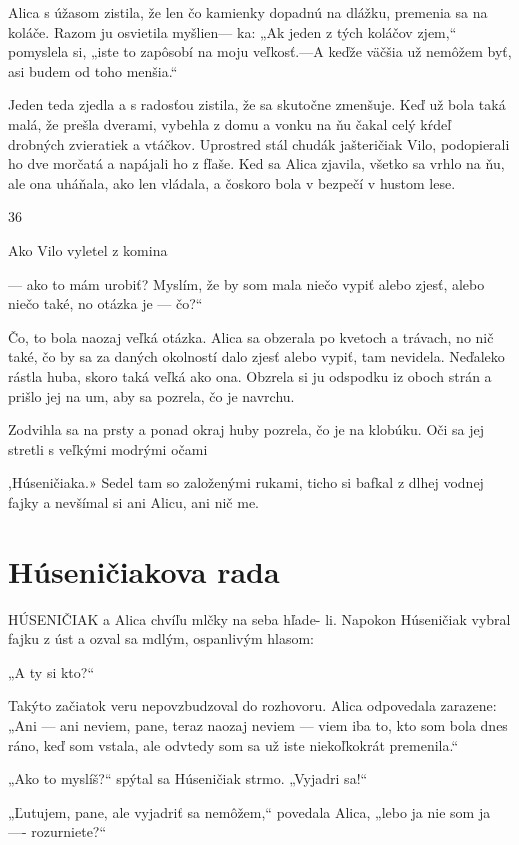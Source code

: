 \documentclass[12pt]{article}
\begin{document}
\begin{Parallel}[p]{}{}
{{Alica s úžasom zistila, že len čo kamienky dopadnú na
dlážku, premenia sa na koláče. Razom ju osvietila myšlien—
ka: „Ak jeden z tých koláčov zjem,“ pomyslela si, „iste to
zapôsobí na moju veľkosť.—A keďže väčšia už nemôžem byť,
asi budem od toho menšia.“

Jeden teda zjedla a s radosťou zistila, že sa skutočne
zmenšuje. Keď už bola taká malá, že prešla dverami,
vybehla z domu a vonku na ňu čakal celý kŕdeľ drobných
zvieratiek a vtáčkov. Uprostred stál chudák jašteričiak
Vilo, podopierali ho dve morčatá a napájali ho z fľaše.
Ked sa Alica zjavila, všetko sa vrhlo na ňu, ale ona uháňala,
ako len vládala, a čoskoro bola v bezpečí v hustom lese.

36

Ako Vilo vyletel z komina

— ako to mám urobiť? Myslím, že by som mala niečo vypiť
alebo zjesť, alebo niečo také, no otázka je — čo?“

Čo, to bola naozaj veľká otázka. Alica sa obzerala po
kvetoch a trávach, no nič také, čo by sa za daných okolností
dalo zjesť alebo vypiť, tam nevidela. Neďaleko rástla huba,
skoro taká veľká ako ona. Obzrela si ju odspodku iz oboch
strán a prišlo jej na um, aby sa pozrela, čo je navrchu.

Zodvihla sa na prsty a ponad okraj huby pozrela, čo je na
klobúku. Oči sa jej stretli s veľkými modrými očami

,Húseničiaka.» Sedel tam so založenými rukami, ticho si
bafkal z dlhej vodnej fajky a nevšímal si ani Alicu, ani nič
me.

\section{Húseničiakova rada}

HÚSENIČIAK a Alica chvíľu mlčky na seba hľade-
li. Napokon Húseničiak vybral fajku z úst a ozval sa
mdlým, ospanlivým hlasom:

„A ty si kto?“

Takýto začiatok veru nepovzbudzoval do rozhovoru.
Alica odpovedala zarazene: „Ani — ani neviem, pane, teraz
naozaj neviem — viem iba to, kto som bola dnes ráno, keď
som vstala, ale odvtedy som sa už iste niekoľkokrát
premenila.“

„Ako to myslíš?“ spýtal sa Húseničiak strmo. „Vyjadri
sa!“

„Ľutujem, pane, ale vyjadriť sa nemôžem,“ povedala
Alica, „lebo ja nie som ja —- rozurniete?“

}}
\end{Parallel}
\end{document}
